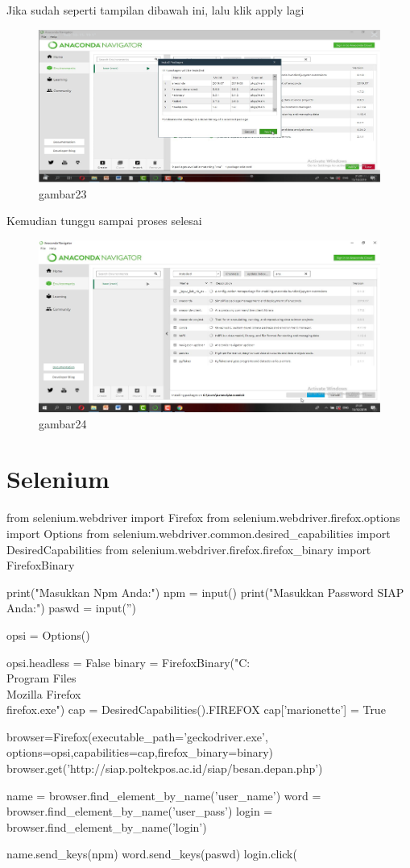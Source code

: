 Jika sudah seperti tampilan dibawah ini, lalu klik apply lagi
\begin{figure}[h]
\centering
    \includegraphics[scale=0.9]{section/57.png}
\caption{gambar23}
\label{fig:my_label}
\end{figure}

Kemudian tunggu sampai proses selesai
\begin{figure}[h]
\centering
    \includegraphics[scale=0.9]{section/58.png}
\caption{gambar24}
\label{fig:my_label}
\end{figure}

\section{Selenium}

from selenium.webdriver import Firefox
from selenium.webdriver.firefox.options import Options
from selenium.webdriver.common.desired_capabilities import DesiredCapabilities
from selenium.webdriver.firefox.firefox_binary import FirefoxBinary

print("Masukkan Npm Anda:")
npm = input()
print("Masukkan Password SIAP Anda:")
paswd = input('')

opsi = Options()

opsi.headless = False
binary = FirefoxBinary("C:\\Program Files\\Mozilla Firefox\\firefox.exe")
cap = DesiredCapabilities().FIREFOX
cap['marionette'] = True

browser=Firefox(executable_path='geckodriver.exe',
options=opsi,capabilities=cap,firefox_binary=binary)
browser.get('http://siap.poltekpos.ac.id/siap/besan.depan.php')

name = browser.find_element_by_name('user_name')
word = browser.find_element_by_name('user_pass')
login = browser.find_element_by_name('login')

name.send_keys(npm)
word.send_keys(paswd)
login.click(